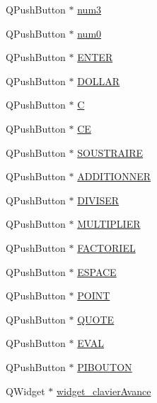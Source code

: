 \begin{DoxyCompactItemize}
\-Q\-Push\-Button $\ast$ \hyperlink{class_ui___main_window_a1cba0408985417af8b8f84ecf490f251}{num3}
\item 
\-Q\-Push\-Button $\ast$ \hyperlink{class_ui___main_window_ad451216d14bbfb46a45e691f81bd5697}{num0}
\item 
\-Q\-Push\-Button $\ast$ \hyperlink{class_ui___main_window_a7d4645de7ef62f35bd4f0d0ff78a7611}{\-E\-N\-T\-E\-R}
\item 
\-Q\-Push\-Button $\ast$ \hyperlink{class_ui___main_window_a56acbb096ec7433f9afe533b440d8123}{\-D\-O\-L\-L\-A\-R}
\item 
\-Q\-Push\-Button $\ast$ \hyperlink{class_ui___main_window_ab159e22a78929113617dcf7d4af66b7e}{\-C}
\item 
\-Q\-Push\-Button $\ast$ \hyperlink{class_ui___main_window_a416e9c24bb7c8e85be227044461177ec}{\-C\-E}
\item 
\-Q\-Push\-Button $\ast$ \hyperlink{class_ui___main_window_ac0e681bd2bc1ee327deede20741b33c7}{\-S\-O\-U\-S\-T\-R\-A\-I\-R\-E}
\item 
\-Q\-Push\-Button $\ast$ \hyperlink{class_ui___main_window_a5881999c31ff45cbe8bdb517a8884e3f}{\-A\-D\-D\-I\-T\-I\-O\-N\-N\-E\-R}
\item 
\-Q\-Push\-Button $\ast$ \hyperlink{class_ui___main_window_aa03160fab513dd8c4942725310a79bbb}{\-D\-I\-V\-I\-S\-E\-R}
\item 
\-Q\-Push\-Button $\ast$ \hyperlink{class_ui___main_window_a0093863cdee1f0a9f32f80a145eb9d74}{\-M\-U\-L\-T\-I\-P\-L\-I\-E\-R}
\item 
\-Q\-Push\-Button $\ast$ \hyperlink{class_ui___main_window_a3b9631153562751675ef6fe58d72fe68}{\-F\-A\-C\-T\-O\-R\-I\-E\-L}
\item 
\-Q\-Push\-Button $\ast$ \hyperlink{class_ui___main_window_a2857c52a8366fe68798acdc44afa0fed}{\-E\-S\-P\-A\-C\-E}
\item 
\-Q\-Push\-Button $\ast$ \hyperlink{class_ui___main_window_afea79b7d0abfd420abade70c22e611e9}{\-P\-O\-I\-N\-T}
\item 
\-Q\-Push\-Button $\ast$ \hyperlink{class_ui___main_window_a1e4151d33099f88be6126ffa57e3a6a8}{\-Q\-U\-O\-T\-E}
\item 
\-Q\-Push\-Button $\ast$ \hyperlink{class_ui___main_window_aafa19488033af699d2e20192f189de49}{\-E\-V\-A\-L}
\item 
\-Q\-Push\-Button $\ast$ \hyperlink{class_ui___main_window_a10499cba7898eb6c0827b13d2b2e09e4}{\-P\-I\-B\-O\-U\-T\-O\-N}
\item 
\-Q\-Widget $\ast$ \hyperlink{class_ui___main_window_afc376b376159bf114d26ad55b43e87b0}{widget\-\_\-clavier\-Avance}

\end{DoxyCompactItemize}

